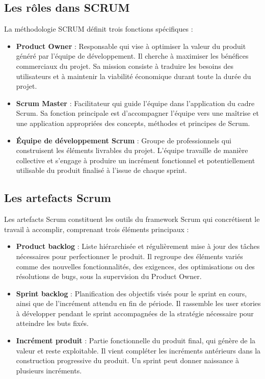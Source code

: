 \subsection{Les rôles dans SCRUM}

\noindent La méthodologie SCRUM définit trois fonctions spécifiques :
\begin{itemize}
    \item \textbf{Product Owner} : Responsable qui vise à optimiser la valeur du produit généré par l'équipe de développement. Il cherche à maximiser les bénéfices commerciaux du projet. Sa mission consiste à traduire les besoins des utilisateurs et à maintenir la viabilité économique durant toute la durée du projet.

    \item \textbf{Scrum Master} : Facilitateur qui guide l'équipe dans l'application du cadre Scrum. Sa fonction principale est d'accompagner l'équipe vers une maîtrise et une application appropriées des concepts, méthodes et principes de Scrum.

    \item \textbf{Équipe de développement Scrum} : Groupe de professionnels qui construisent les éléments livrables du projet. L'équipe travaille de manière collective et s'engage à produire un incrément fonctionnel et potentiellement utilisable du produit finalisé à l'issue de chaque sprint.
\end{itemize}

\subsection{Les artefacts Scrum}

\noindent Les artefacts Scrum constituent les outils du framework Scrum qui concrétisent le travail à accomplir, comprenant trois éléments principaux :
\begin{itemize}
    \item \textbf{Product backlog} : Liste hiérarchisée et régulièrement mise à jour des tâches nécessaires pour perfectionner le produit. Il regroupe des éléments variés comme des nouvelles fonctionnalités, des exigences, des optimisations ou des résolutions de bugs, sous la supervision du Product Owner.

    \item \textbf{Sprint backlog} : Planification des objectifs visés pour le sprint en cours, ainsi que de l'incrément attendu en fin de période. Il rassemble les user stories à développer pendant le sprint accompagnées de la stratégie nécessaire pour atteindre les buts fixés.

    \item \textbf{Incrément produit} : Partie fonctionnelle du produit final, qui génère de la valeur et reste exploitable. Il vient compléter les incréments antérieurs dans la construction progressive du produit. Un sprint peut donner naissance à plusieurs incréments.
\end{itemize}

